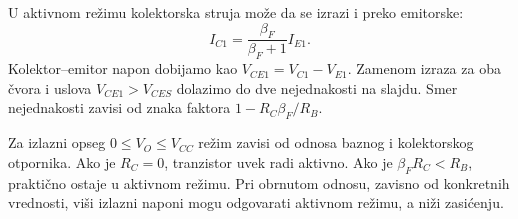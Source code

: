 U aktivnom režimu kolektorska struja može da se izrazi i preko emitorske:
\[I_{C1}=\frac{\beta_F}{\beta_F+1}I_{E1}.\]
Kolektor–emitor napon dobijamo kao $V_{CE1}=V_{C1}-V_{E1}$. Zamenom izraza za oba čvora i uslova $V_{CE1}>V_{CES}$ dolazimo do dve nejednakosti na slajdu. Smer nejednakosti zavisi od znaka faktora $1-R_C\beta_F/R_B$.

Za izlazni opseg $0\leq V_O\leq V_{CC}$ režim zavisi od odnosa baznog i kolektorskog otpornika. Ako je $R_C=0$, tranzistor uvek radi aktivno. Ako je $\beta_FR_C<R_B$, praktično ostaje u aktivnom režimu. Pri obrnutom odnosu, zavisno od konkretnih vrednosti, viši izlazni naponi mogu odgovarati aktivnom režimu, a niži zasićenju.
